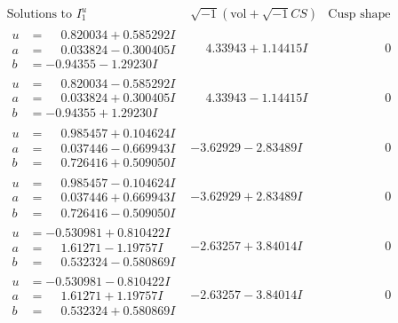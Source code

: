 \documentclass[1p]{elsarticle_modified}
\theoremstyle{definition}
\newcommand{\I}{\sqrt{-1}}
\begin{document}
$$\begin{array}{c|c|c}  
\text{Solutions to }I^u_{1}& \I (\text{vol} + \sqrt{-1}CS) & \text{Cusp shape}\\
 \hline 
\begin{aligned}
u &= \phantom{-}0.820034 + 0.585292 I \\
a &= \phantom{-}0.033824 - 0.300405 I \\
b &= -0.94355 - 1.29230 I\end{aligned}
 & \phantom{-}4.33943 + 1.14415 I & \phantom{-0.000000 } 0 \\ \hline\begin{aligned}
u &= \phantom{-}0.820034 - 0.585292 I \\
a &= \phantom{-}0.033824 + 0.300405 I \\
b &= -0.94355 + 1.29230 I\end{aligned}
 & \phantom{-}4.33943 - 1.14415 I & \phantom{-0.000000 } 0 \\ \hline\begin{aligned}
u &= \phantom{-}0.985457 + 0.104624 I \\
a &= \phantom{-}0.037446 - 0.669943 I \\
b &= \phantom{-}0.726416 + 0.509050 I\end{aligned}
 & -3.62929 - 2.83489 I & \phantom{-0.000000 } 0 \\ \hline\begin{aligned}
u &= \phantom{-}0.985457 - 0.104624 I \\
a &= \phantom{-}0.037446 + 0.669943 I \\
b &= \phantom{-}0.726416 - 0.509050 I\end{aligned}
 & -3.62929 + 2.83489 I & \phantom{-0.000000 } 0 \\ \hline\begin{aligned}
u &= -0.530981 + 0.810422 I \\
a &= \phantom{-}1.61271 - 1.19757 I \\
b &= \phantom{-}0.532324 - 0.580869 I\end{aligned}
 & -2.63257 + 3.84014 I & \phantom{-0.000000 } 0 \\ \hline\begin{aligned}
u &= -0.530981 - 0.810422 I \\
a &= \phantom{-}1.61271 + 1.19757 I \\
b &= \phantom{-}0.532324 + 0.580869 I\end{aligned}
 & -2.63257 - 3.84014 I & \phantom{-0.000000 } 0 \\ \hline\begin{aligned}

\end{aligned}
\end{array}$$
\end{document}
